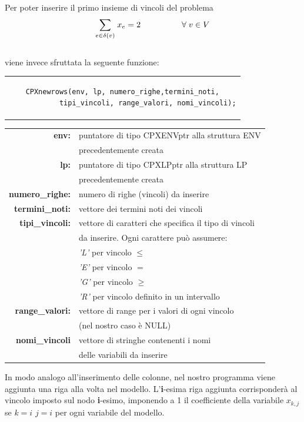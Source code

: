 Per poter inserire il primo insieme di vincoli del problema\\
$$
\underset{e\in \delta(v)}\sum{\;x_e} = 2\;\;\;\;\;\;\;\;\;\;\;\;\;\;\;\;\;\;\forall\;v\in V \\\\
$$
\\
viene invece sfruttata la seguente funzione:
\begin{center}
\begin{tabular}{c}
\begin{lstlisting}[linewidth=330pt, basicstyle=\footnotesize\sffamily,]     
 CPXnewrows(env, lp, numero_righe,termini_noti,
            tipi_vincoli, range_valori, nomi_vincoli);
\end{lstlisting}
\end{tabular}
\end{center}
\begin{table}[h]
\begin{tabular}{rl}
\textbf{env:} & {puntatore di tipo CPXENVptr alla struttura ENV}\\
& {precedentemente creata}\\
\textbf{lp:} & {puntatore di tipo CPXLPptr alla struttura LP}\\
& {precedentemente creata}\\
\textbf{numero\_righe:} & {numero di righe (vincoli) da inserire}\\
\textbf{termini\_noti:} & {vettore dei termini noti dei vincoli}\\
\textbf{tipi\_vincoli:} & {vettore di caratteri che specifica il tipo di vincoli}\\
&{da inserire. Ogni carattere può assumere:}\\
&{\textit{'L'} per vincolo $\leq$}\\
&{\textit{'E'} per vincolo $=$}\\
&{\textit{'G'} per vincolo $\geq$}\\
&{\textit{'R'} per vincolo definito in un intervallo}\\
\textbf{range\_valori:} & {vettore di range per i valori di ogni vincolo}\\
& {(nel nostro caso è NULL)} \\
\textbf{nomi\_vincoli} & vettore di stringhe contenenti i nomi  \\
                  & delle variabili da inserire
\end{tabular}
\end{table}
In modo analogo all'inserimento delle colonne, nel nostro programma viene aggiunta una riga alla volta nel modello. L'\textbf{i}-esima riga aggiunta corrisponderà al vincolo imposto sul nodo \textbf{i}-esimo, imponendo a 1 il coefficiente della variabile $x_{k,j}$ se $k=i$ $j=i$ per ogni variabile del modello.\\\\
